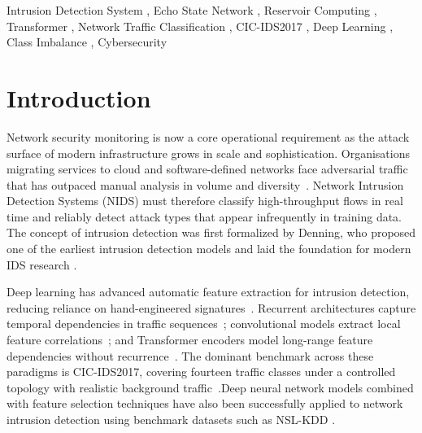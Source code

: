 \documentclass[5p,times]{elsarticle}
\begin{document}
\begin{frontmatter}
\begin{abstract}
			These findings suggest that reservoir-to-attention coupling is a stable and parameter-efficient design for intrusion detection. They also indicate that CICFlowMeter-based flow features are better suited to classical tabular learners than to sequential models, implying that the proposed architecture may be more effective for packet-level or temporally ordered traffic streams.
		\end{abstract}
		
		\begin{keyword}
			Intrusion Detection System \sep
			Echo State Network \sep
			Reservoir Computing \sep
			Transformer \sep
			Network Traffic Classification \sep
			CIC-IDS2017 \sep
			Deep Learning \sep
			Class Imbalance \sep
			Cybersecurity
		\end{keyword}
		
	\end{frontmatter}
	
	
	\section{Introduction}
	\label{sec:intro}
	
	Network security monitoring is now a core operational requirement as the
	attack surface of modern infrastructure grows in scale and sophistication.
	Organisations migrating services to cloud and software-defined networks
	face adversarial traffic that has outpaced manual analysis in volume and
	diversity~\cite{buczak2016survey,khraisat2019survey}. Network Intrusion
	Detection Systems (NIDS) must therefore classify high-throughput flows in
	real time and reliably detect attack types that appear infrequently in
	training data.
	The concept of intrusion detection was first formalized by Denning, who proposed one of the earliest intrusion detection models and laid the foundation for modern IDS research \cite{denning1987}.
	
	Deep learning has advanced automatic feature extraction for intrusion
	detection, reducing reliance on hand-engineered
	signatures~\cite{vinayakumar2019deep,yin2017deep}. Recurrent architectures
	capture temporal dependencies in traffic sequences~\cite{grurnn2018};
	convolutional models extract local feature
	correlations~\cite{cnnlstm2024,cnnbigru2022}; and Transformer encoders
	model long-range feature dependencies without
	recurrence~\cite{rtids2022,flowformer2024,long2024transformer}. The
	dominant benchmark across these paradigms is CIC-IDS2017, covering
	fourteen traffic classes under a controlled topology with realistic
	background traffic~\cite{cicids2017}.Deep neural network models combined with feature selection techniques have also been successfully applied to network intrusion detection using benchmark datasets such as NSL-KDD \cite{mlp2021}.
	
\end{document}
